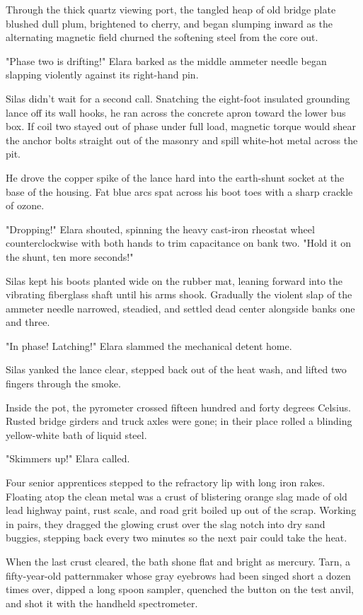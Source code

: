 Through the thick quartz viewing port, the tangled heap of old bridge plate blushed dull plum, brightened to cherry, and began slumping inward as the alternating magnetic field churned the softening steel from the core out.

"Phase two is drifting!" Elara barked as the middle ammeter needle began slapping violently against its right-hand pin.

Silas didn't wait for a second call. Snatching the eight-foot insulated grounding lance off its wall hooks, he ran across the concrete apron toward the lower bus box. If coil two stayed out of phase under full load, magnetic torque would shear the anchor bolts straight out of the masonry and spill white-hot metal across the pit.

He drove the copper spike of the lance hard into the earth-shunt socket at the base of the housing. Fat blue arcs spat across his boot toes with a sharp crackle of ozone.

"Dropping!" Elara shouted, spinning the heavy cast-iron rheostat wheel counterclockwise with both hands to trim capacitance on bank two. "Hold it on the shunt, ten more seconds!"

Silas kept his boots planted wide on the rubber mat, leaning forward into the vibrating fiberglass shaft until his arms shook. Gradually the violent slap of the ammeter needle narrowed, steadied, and settled dead center alongside banks one and three.

"In phase! Latching!" Elara slammed the mechanical detent home.

Silas yanked the lance clear, stepped back out of the heat wash, and lifted two fingers through the smoke.

Inside the pot, the pyrometer crossed fifteen hundred and forty degrees Celsius. Rusted bridge girders and truck axles were gone; in their place rolled a blinding yellow-white bath of liquid steel.

"Skimmers up!" Elara called.

Four senior apprentices stepped to the refractory lip with long iron rakes. Floating atop the clean metal was a crust of blistering orange slag made of old lead highway paint, rust scale, and road grit boiled up out of the scrap. Working in pairs, they dragged the glowing crust over the slag notch into dry sand buggies, stepping back every two minutes so the next pair could take the heat.

When the last crust cleared, the bath shone flat and bright as mercury. Tarn, a fifty-year-old patternmaker whose gray eyebrows had been singed short a dozen times over, dipped a long spoon sampler, quenched the button on the test anvil, and shot it with the handheld spectrometer.

